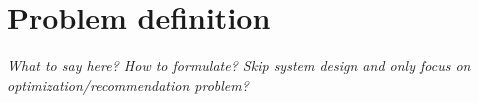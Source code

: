 
\section{Problem definition}\label{sec:intro:prob}


\textit{What to say here? How to formulate? Skip system design and only focus on optimization/recommendation problem? }

